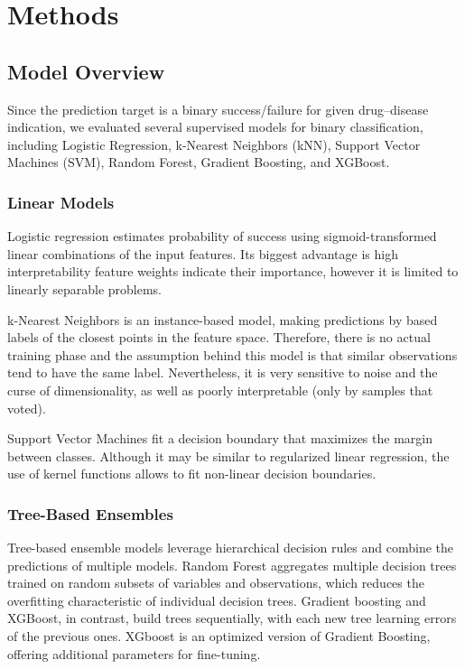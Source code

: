 \section{Methods}

\subsection{Model Overview}

Since the prediction target is a binary success/failure for given drug--disease indication, we
 evaluated several supervised models for binary classification, 
including Logistic Regression, 
k-Nearest Neighbors (kNN), 
Support Vector Machines (SVM), 
Random Forest, 
Gradient Boosting, 
and XGBoost.

\subsubsection{Linear Models}

Logistic regression estimates probability of success using sigmoid-transformed
 linear combinations of the input features. Its biggest advantage is high interpretability 
feature weights indicate their importance, however it is limited to linearly
 separable problems.

k-Nearest Neighbors is an instance-based model, making predictions by based labels
of the closest points in the feature space. Therefore, there is no actual training phase and the assumption behind
 this model is that similar observations tend to have the same label. Nevertheless, it is very sensitive to noise 
 and the curse of dimensionality, as well as poorly interpretable (only by samples that voted).

Support Vector Machines fit a decision boundary that maximizes the margin between classes.
Although it may be similar to regularized linear regression, the use of kernel functions
allows to fit non-linear decision boundaries.

\subsubsection{Tree-Based Ensembles}

Tree-based ensemble models leverage hierarchical decision rules
 and combine the predictions of multiple models. Random Forest aggregates 
 multiple decision trees trained on random subsets of variables and observations, 
 which reduces the overfitting characteristic of individual decision trees. Gradient boosting and
 XGBoost, in contrast, build trees sequentially, with each new tree learning errors of the previous ones.
 XGboost is an optimized version of Gradient Boosting, offering additional parameters for fine-tuning.

